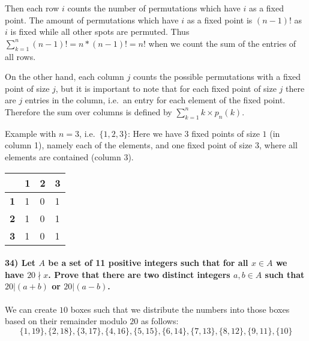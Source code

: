 \documentclass[
]{article}
\begin{document}
Then each row \(i\) counts the number of permutations which have \(i\)
as a fixed point. The amount of permutations which have \(i\) as a fixed
point is \((n-1)!\) as \(i\) is fixed while all other spots are
permuted. Thus \(\sum_{k=1}^n (n-1)! = n*(n-1)! = n!\) when we count the
sum of the entries of all rows.

On the other hand, each column \(j\) counts the possible permutations
with a fixed point of size \(j\), but it is important to note that for
each fixed point of size \(j\) there are \(j\) entries in the column,
i.e.~an entry for each element of the fixed point. Therefore the sum
over columns is defined by \(\sum_{k=1}^n k \times p_n(k)\).

Example with \(n=3\), i.e.~\(\{1,2,3\}\): Here we have \(3\) fixed
points of size \(1\) (in column 1), namely each of the elements, and one
fixed point of size \(3\), where all elements are contained (column 3).

\begin{longtable}[]{@{}llll@{}}
\toprule()
& 1 & 2 & 3 \\
\midrule()
\endhead
\textbf{1} & 1 & 0 & 1 \\
\textbf{2} & 1 & 0 & 1 \\
\textbf{3} & 1 & 0 & 1 \\
\bottomrule()
\end{longtable}

\hypertarget{let-a-be-a-set-of-11-positive-integers-such-that-for-all-x-in-a-we-have-20-nmid-x.-prove-that-there-are-two-distinct-integers-ab-in-a-such-that-20-ab-or-20-a-b.}{%
\paragraph{\texorpdfstring{34) Let \(A\) be a set of 11 positive
integers such that for all \(x \in A\) we have \(20 \nmid x\). Prove
that there are two distinct integers \(a,b \in A\) such that
\(20 | (a+b)\) or
\(20 | (a-b)\).}{34) Let A be a set of 11 positive integers such that for all x \textbackslash in A we have 20 \textbackslash nmid x. Prove that there are two distinct integers a,b \textbackslash in A such that 20 \textbar{} (a+b) or 20 \textbar{} (a-b).}}\label{let-a-be-a-set-of-11-positive-integers-such-that-for-all-x-in-a-we-have-20-nmid-x.-prove-that-there-are-two-distinct-integers-ab-in-a-such-that-20-ab-or-20-a-b.}}

We can create \(10\) boxes such that we distribute the numbers into
those boxes based on their remainder modulo \(20\) as follows: \[
\{1,19\}, \{2,18\}, \{3,17\}, \{4,16\}, \{5,15\}, \{6,14\}, \{7,13\}, \{8,12\}, \{9,11\},\{10\}
\]
\end{document}
